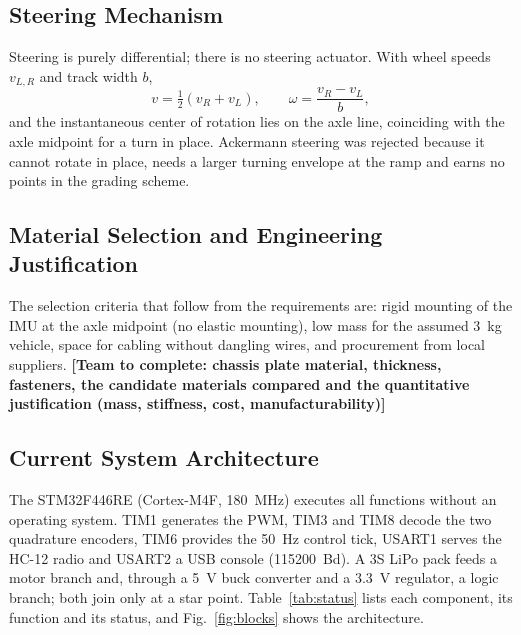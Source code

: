 \documentclass[conference]{IEEEtran}\newcommand{\haveieee}{}%
\newcommand{\todo}[1]{{\color{red}\textbf{[#1]}}}
\begin{document}
\subsection{Steering Mechanism}
Steering is purely differential; there is no steering actuator. With wheel speeds $v_{L,R}$ and track width $b$,
\begin{equation}
v=\tfrac12(v_R+v_L),\qquad \omega=\frac{v_R-v_L}{b},
\label{eq:kin}
\end{equation}
and the instantaneous center of rotation lies on the axle line, coinciding with the axle midpoint for a turn in place. Ackermann steering was rejected because it cannot rotate in place, needs a larger turning envelope at the ramp and earns no points in the grading scheme.

\subsection{Material Selection and Engineering Justification}
The selection criteria that follow from the requirements are: rigid mounting of the IMU at the axle midpoint (no elastic mounting), low mass for the assumed 3~kg vehicle, space for cabling without dangling wires, and procurement from local suppliers. \todo{Team to complete: chassis plate material, thickness, fasteners, the candidate materials compared and the quantitative justification (mass, stiffness, cost, manufacturability)}

\subsection{Current System Architecture}
The STM32F446RE (Cortex-M4F, 180~MHz) executes all functions without an operating system. TIM1 generates the PWM, TIM3 and TIM8 decode the two quadrature encoders, TIM6 provides the 50~Hz control tick, USART1 serves the HC-12 radio and USART2 a USB console (115200~Bd). A 3S LiPo pack feeds a motor branch and, through a 5~V buck converter and a 3.3~V regulator, a logic branch; both join only at a star point. Table~\ref{tab:status} lists each component, its function and its status, and Fig.~\ref{fig:blocks} shows the architecture.
\end{document}
